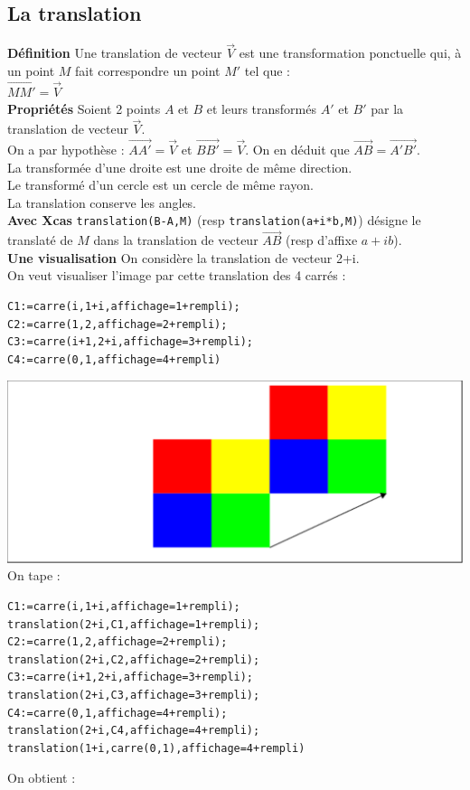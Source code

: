 \documentclass[a4paper,11pt]{book}
\begin{document}
\subsection{La translation}
{\bf D\'efinition}
Une translation de vecteur $\overrightarrow{V}$ est une transformation 
ponctuelle qui, \`a un point $M$ fait correspondre un point $M'$ tel que :\\
$\overrightarrow{MM'}=\overrightarrow{V}$\\
{\bf Propri\'et\'es}
Soient 2 points $A$ et $B$ et leurs transform\'es $A'$ et $B'$ par la 
translation de vecteur $\overrightarrow{V}$.\\
On a par hypoth\`ese :
$\overrightarrow{AA'}=\overrightarrow{V}$ et $\overrightarrow{BB'}=\overrightarrow{V}$.
On en d\'eduit que $\overrightarrow{AB}=\overrightarrow{A'B'}$.\\
La transform\'ee d'une droite est une droite de m\^eme direction.\\
Le transform\'e d'un cercle est un cercle de m\^eme rayon.\\
La translation conserve les angles.\\
{\bf Avec Xcas}
{\tt translation(B-A,M)} (resp {\tt translation(a+i*b,M)}) d\'esigne le 
translat\'e de $M$ dans la translation de vecteur $\overrightarrow{AB}$ (resp 
d'affixe $a+ib$).\\
{\bf Une visualisation}
On consid\`ere la translation de vecteur 2+i.\\
On veut visualiser l'image par cette translation des 4 carr\'es :
\begin{verbatim}
C1:=carre(i,1+i,affichage=1+rempli);
C2:=carre(1,2,affichage=2+rempli);
C3:=carre(i+1,2+i,affichage=3+rempli);
C4:=carre(0,1,affichage=4+rempli)
\end{verbatim}
\includegraphics[width=\textwidth]{damiertrans1}\\
On tape :
\begin{verbatim}
C1:=carre(i,1+i,affichage=1+rempli);
translation(2+i,C1,affichage=1+rempli);
C2:=carre(1,2,affichage=2+rempli);
translation(2+i,C2,affichage=2+rempli);
C3:=carre(i+1,2+i,affichage=3+rempli);
translation(2+i,C3,affichage=3+rempli);
C4:=carre(0,1,affichage=4+rempli);
translation(2+i,C4,affichage=4+rempli);
translation(1+i,carre(0,1),affichage=4+rempli)
\end{verbatim}
On obtient :\\
\ \\
\end{document}

